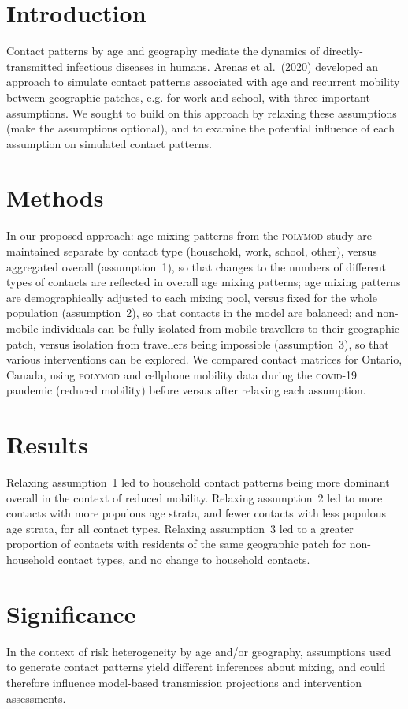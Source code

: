 \section{Introduction}
Contact patterns by age and geography mediate the dynamics of directly-transmitted infectious diseases in humans.
Arenas et al.\ (2020) developed an approach to simulate contact patterns associated with
age and recurrent mobility between geographic patches, e.g. for work and school, with three important assumptions.
We sought to build on this approach by relaxing these assumptions (make the assumptions optional),
and to examine the potential influence of each assumption on simulated contact patterns.
\section{Methods}
In our proposed approach:
age mixing patterns from the \textsc{polymod} study are maintained separate by contact type
(household, work, school, other),
versus aggregated overall (assumption~1),
so that changes to the numbers of different types of contacts are reflected in overall age mixing patterns;
age mixing patterns are demographically adjusted to each mixing pool,
versus fixed for the whole population (assumption~2),
so that contacts in the model are balanced; and
non-mobile individuals can be fully isolated from mobile travellers to their geographic patch,
versus isolation from travellers being impossible (assumption~3),
so that various interventions can be explored.
We compared contact matrices for Ontario, Canada,
using \textsc{polymod} and cellphone mobility data during the \textsc{covid-19} pandemic (reduced mobility)
before versus after relaxing each assumption.
\section{Results}
Relaxing assumption~1 led to
household contact patterns being more dominant overall in the context of reduced mobility.
Relaxing assumption~2 led to
more contacts with more populous age strata, and fewer contacts with less populous age strata,
for all contact types.
Relaxing assumption~3 led to
a greater proportion of contacts with residents of the same geographic patch for non-household contact types,
and no change to household contacts.
\section{Significance}
In the context of risk heterogeneity by age and/or geography,
assumptions used to generate contact patterns yield different inferences about mixing,
and could therefore influence model-based transmission projections and intervention assessments.